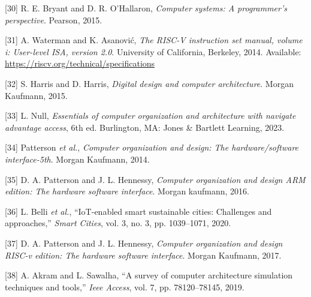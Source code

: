 \documentclass[12pt,oneside]{templates/unerthesis}
\newcommand{\CSLLeftMargin}[1]{#1} %
\newcommand{\CSLRightInline}[1]{#1} %
\newlength{\cslhangindent}
\newenvironment{CSLReferences}[2] %
 {\setlength{\parindent}{0pt}%
  \setlength{\leftskip}{#1 pt\relax}%
  \setlength{\parskip}{#2 pt\relax}%
  \everypar{\setlength{\hangindent}{\cslhangindent}}}
 {\par}
\begin{document}
\begin{CSLReferences}{0}{0}
\leavevmode{}%
\CSLLeftMargin{{[}30{]} }%
\CSLRightInline{R. E. Bryant and D. R. O'Hallaron, \emph{Computer systems: A programmer's perspective}. Pearson, 2015.}

\leavevmode{}%
\CSLLeftMargin{{[}31{]} }%
\CSLRightInline{A. Waterman and K. Asanović, \emph{The {RISC}-{V} instruction set manual, volume i: User-level ISA, version 2.0}. University of California, Berkeley, 2014. Available: \url{https://riscv.org/technical/specifications}}

\leavevmode{}%
\CSLLeftMargin{{[}32{]} }%
\CSLRightInline{S. Harris and D. Harris, \emph{Digital design and computer architecture}. Morgan Kaufmann, 2015.}

\leavevmode{}%
\CSLLeftMargin{{[}33{]} }%
\CSLRightInline{L. Null, \emph{Essentials of computer organization and architecture with navigate advantage access}, 6th ed. Burlington, MA: Jones \& Bartlett Learning, 2023.}

\leavevmode{}%
\CSLLeftMargin{{[}34{]} }%
\CSLRightInline{Patterson \emph{et al.}, \emph{Computer organization and design: The hardware/software interface-5th}. Morgan Kaufmann, 2014.}

\leavevmode{}%
\CSLLeftMargin{{[}35{]} }%
\CSLRightInline{D. A. Patterson and J. L. Hennessy, \emph{Computer organization and design ARM edition: The hardware software interface}. Morgan kaufmann, 2016.}

\leavevmode{}%
\CSLLeftMargin{{[}36{]} }%
\CSLRightInline{L. Belli \emph{et al.}, {``IoT-enabled smart sustainable cities: Challenges and approaches,''} \emph{Smart Cities}, vol. 3, no. 3, pp. 1039--1071, 2020.}

\leavevmode{}%
\CSLLeftMargin{{[}37{]} }%
\CSLRightInline{D. A. Patterson and J. L. Hennessy, \emph{Computer organization and design RISC-v edition: The hardware software interface}. Morgan Kaufmann, 2017.}

\leavevmode{}%
\CSLLeftMargin{{[}38{]} }%
\CSLRightInline{A. Akram and L. Sawalha, {``A survey of computer architecture simulation techniques and tools,''} \emph{Ieee Access}, vol. 7, pp. 78120--78145, 2019.}


\end{CSLReferences}
\end{document}
